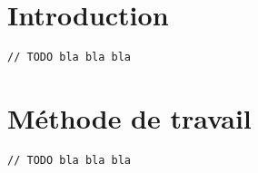 \chapter*{Introduction}
\verb+// TODO bla bla bla+
\clearemptydoublepage
\chapter*{Méthode de travail}
\verb+// TODO bla bla bla+